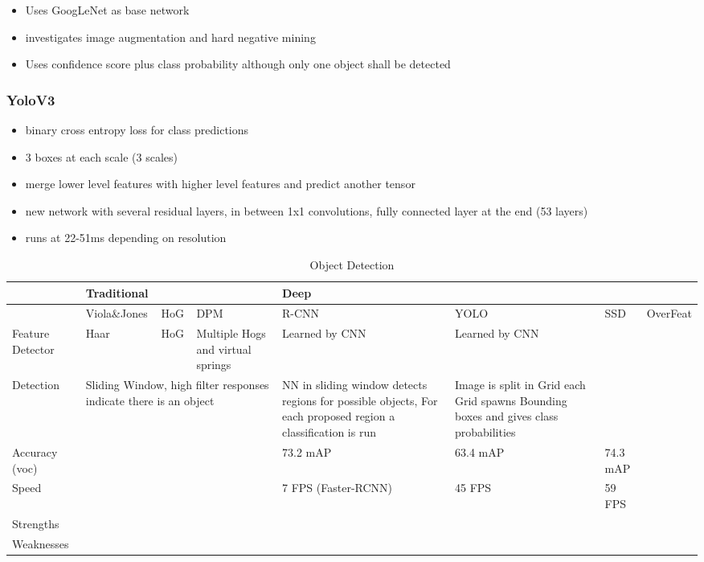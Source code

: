 	\begin{itemize}
		\item Uses GoogLeNet as base network
		\item investigates image augmentation and hard negative mining
		\item Uses confidence score plus class probability although only one object shall be detected
	\end{itemize}
		
	\subsubsection{YoloV3 \cite{Redmona}}
	\begin{itemize}
		\item binary cross entropy loss for class predictions
		\item 3 boxes at each scale (3 scales)
		\item merge lower level features with higher level features and predict another tensor
		\item new network with several residual layers, in between 1x1 convolutions, fully connected layer at the end (53 layers)
		\item runs at 22-51ms depending on resolution
	\end{itemize}

\begin{table}[]
	
	\caption{Object Detection}
	\label{my-label}
	\begin{tabular}{|p{3cm}|p{3cm}|p{3cm}|p{3cm}|p{3cm}|p{3cm}|p{3cm}|p{3cm}|}
		\hline
		& \multicolumn{3}{l|}{Traditional} & \multicolumn{4}{l|}{Deep}   \\ \hline
		& Viola\&Jones    				   & HoG    & DPM   		   & R-CNN    & YOLO         & SSD & OverFeat \\ \hline
		Feature Detector & Haar					   & HoG    & Multiple Hogs and virtual springs   & Learned by CNN     &  Learned by CNN            & & \\ \hline
		Detection & \multicolumn{3}{l|}{Sliding Window, high filter responses indicate there is an object} & NN in sliding window detects regions for possible objects, For each proposed region a classification is run & Image is split in Grid each Grid spawns Bounding boxes and gives class probabilities & & \\
		\hline
		Accuracy (voc) &  & & & 73.2 mAP & 63.4 mAP & 74.3 mAP & \\ 
		\hline
		Speed & & & & 7 FPS (Faster-RCNN) & 45 FPS & 59 FPS & \\
		\hline
		Strengths & & & & & &  &\\
		\hline
		Weaknesses & & & & & &  &\\
		\hline
		\end{tabular}
		
		\end{table}


